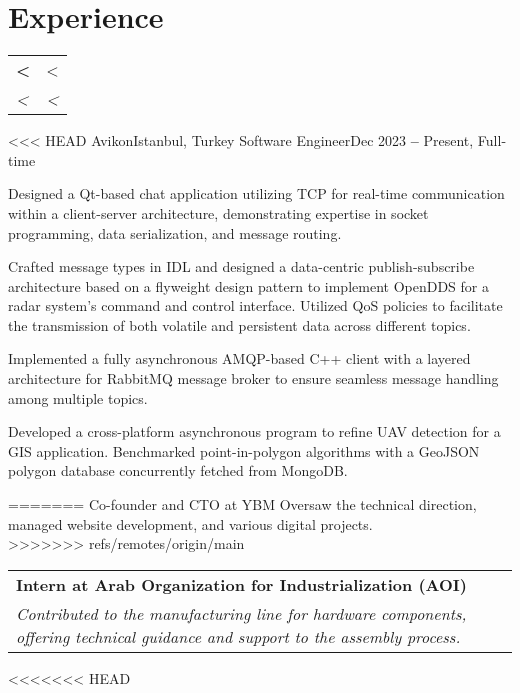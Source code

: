 \documentclass[letterpaper,11pt]{article}
\makeatletter
\newcommand{\resumeItem}[1]{\item\small{{#1 \vspace{-2pt}}}}
\newcommand{\resumeSubheading}[4]{\vspace{-2pt}\item
    \begin{tabular*}{0.97\textwidth}[t]{l@{\extracolsep{\fill}}r}
      \textbf{#1} & #2 \\
      \textit{\small#3} & \textit{\small #4} \\
    \end{tabular*}\vspace{-7pt}
}
\makeatother
\begin{document}
\section{Experience}
\resumeSubHeadingListStart
    \resumeSubheading
<<<<<<< HEAD
      {Avikon}{Istanbul, Turkey}
      {Software Engineer}{Dec 2023 \textbf{--} Present, Full-time}
        \resumeItemListStart
            \resumeItem{Designed a Qt-based chat application utilizing TCP for real-time communication within a client-server architecture, demonstrating expertise in socket programming, data serialization, and message routing.}
            \resumeItem{Crafted message types in IDL and designed a data-centric publish-subscribe architecture based on a flyweight design pattern to implement OpenDDS for a radar system's command and control interface. Utilized QoS policies to facilitate the transmission of both volatile and persistent data across different topics.}
            \resumeItem{Implemented a fully asynchronous AMQP-based C++ client with a layered architecture for RabbitMQ message broker to ensure seamless message handling among multiple topics.}
            \resumeItem{Developed a cross-platform asynchronous program to refine UAV detection for a GIS application. Benchmarked point-in-polygon algorithms with a GeoJSON polygon database concurrently fetched from MongoDB.}
        \resumeItemListEnd

=======
      {Co-founder and CTO at YBM}{}
      {Oversaw the technical direction, managed website development, and various digital projects.}{}{}\\
>>>>>>> refs/remotes/origin/main
    \resumeSubheading
      {Intern at Arab Organization for Industrialization (AOI)}{}{Contributed to the manufacturing line for hardware components, offering technical guidance and support to the assembly process.}{}
\resumeSubHeadingListEnd

<<<<<<< HEAD
\end{document}
